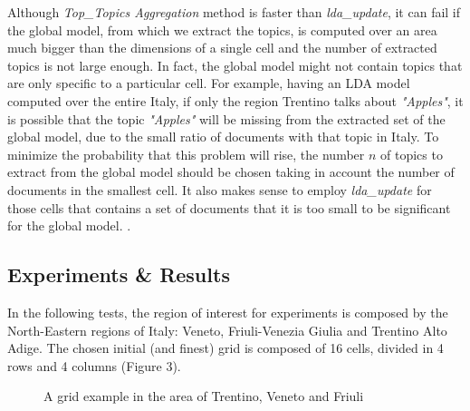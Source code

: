 Although \emph{Top\_Topics Aggregation} method is faster than \emph{lda\_update}, it can fail if the global model, from which we extract the topics, is computed over an area much bigger than the dimensions of a single cell and the number of extracted topics is not large enough. 
In fact, the global model might not contain topics that are only specific to a particular cell. For example, having an LDA model computed over the entire Italy, if only the region Trentino talks about \emph{"Apples"}, it is possible that the topic \emph{"Apples"} will be missing from the extracted set of the global model, due to the small ratio of documents with that topic in Italy. To minimize the probability that this problem will rise, the number $n$ of topics to extract from the global model should be chosen taking in account the number of documents in the smallest cell. It also makes sense to employ \emph{lda\_update} for those cells that contains a set of documents that it is too small to be significant for the global model.
.

\subsection{Experiments \& Results}

In the following tests, the region of interest for experiments is composed by the North-Eastern regions of Italy: Veneto, Friuli-Venezia Giulia and Trentino Alto Adige. The chosen initial (and finest) grid is composed of 16 cells, divided in 4 rows and 4 columns (Figure 3). 

\begin{figure}[h]
	\caption{A grid example in the area of Trentino, Veneto and Friuli}
\end{figure}

